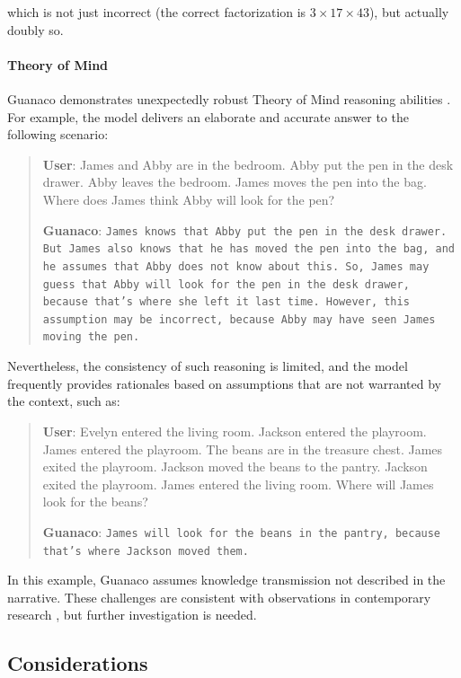 which is not just incorrect (the correct factorization is $3 \times 17 \times 43$), but actually doubly so.

\paragraph{Theory of Mind} {Guanaco} demonstrates unexpectedly robust Theory of Mind reasoning abilities \cite{nematzadeh2018evaluating, sap2022neural}. For example, the model delivers an elaborate and accurate answer to the following scenario:

\begin{quote}
    \textbf{User}: James and Abby are in the bedroom. Abby put the pen in the desk drawer. Abby leaves the bedroom. James moves the pen into the bag. Where does James think Abby will look for the pen?

    \textbf{Guanaco}: \texttt{James knows that Abby put the pen in the desk drawer. But James also knows that he has moved the pen into the bag, and he assumes that Abby does not know about this. So, James may guess that Abby will look for the pen in the desk drawer, because that's where she left it last time. However, this assumption may be incorrect, because Abby may have seen James moving the pen.}
\end{quote}

Nevertheless, the consistency of such reasoning is limited, and the model frequently provides rationales based on assumptions that are not warranted by the context, such as:

\begin{quote}
    \textbf{User}: Evelyn entered the living room. Jackson entered the playroom. James entered the playroom. The beans are in the treasure chest. James exited the playroom. Jackson moved the beans to the pantry. Jackson exited the playroom. James entered the living room. Where will James look for the beans?

    \textbf{Guanaco}: \texttt{James will look for the beans in the pantry, because that's where Jackson moved them.}
\end{quote}

In this example, {Guanaco} assumes knowledge transmission not described in the narrative. These challenges are consistent with observations in contemporary research \cite{sap2022neural}, but further investigation is needed.

\subsection{Considerations}
\label{ssec:considerations}

